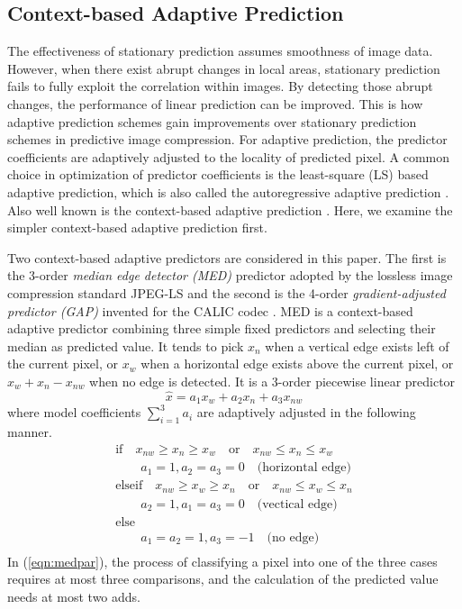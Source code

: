 \documentclass[journal]{IEEEtran}
\begin{document}
\subsection{Context-based Adaptive Prediction}\label{sub:cap}

The effectiveness of stationary prediction assumes smoothness of image data. However, when there
exist abrupt changes in local areas, stationary prediction fails to fully exploit the correlation
within images. By detecting those abrupt changes, the performance of linear prediction can be
improved. This is how adaptive prediction schemes gain improvements over stationary prediction
schemes in predictive image compression. For adaptive prediction, the predictor coefficients are
adaptively adjusted to the locality of predicted pixel. A common choice in optimization of predictor
coefficients is the least-square (LS) based adaptive prediction, which is also called the
autoregressive adaptive prediction \cite{Wu98icip,Li01edp,Kau05lsap}. Also well known is the
context-based adaptive prediction \cite{Memon97predictors}. Here, we examine the simpler
context-based adaptive prediction first.

Two context-based adaptive predictors are considered in this paper. The first is the 3-order
\emph{median edge detector (MED)} predictor adopted by the lossless image compression standard
JPEG-LS \cite{Loco00ip} and the second is the 4-order \emph{gradient-adjusted predictor (GAP)}
invented for the CALIC codec \cite{Wu97calic2,Wu97calic}. MED is a context-based adaptive predictor
combining three simple fixed predictors and selecting their median as predicted value. It tends to
pick $x_n$ when a vertical edge exists left of the current pixel, or $x_w$ when a horizontal edge
exists above the current pixel, or $x_w + x_n - x_{nw}$ when no edge is detected. It is a 3-order
piecewise linear predictor 
\begin{equation}\label{eqn:edpo3}
    \hat{x} = a_1x_{w} + a_2x_{n} + a_3x_{nw}
\end{equation}
where model coefficients $\sum_{i=1}^3 a_i$ are adaptively adjusted in the following manner. 
\begin{equation}\label{eqn:medpar}
    \begin{array}{l}
	\mbox{if} \quad x_{nw} \ge x_n \ge x_w \quad \mbox{or} \quad x_{nw} \le x_n \le x_w \\
	\quad \quad a_1 = 1, a_2 = a_3 = 0 \quad\mbox{(horizontal edge)} \\
	\mbox{elseif} \quad x_{nw} \ge x_w \ge x_n \quad \mbox{or} \quad x_{nw} \le x_w \le x_n \\
	\quad \quad a_2 = 1, a_1 = a_3 = 0 \quad\mbox{(vectical edge)} \\
	\mbox{else} \\
	\quad \quad a_1 = a_2 = 1, a_3 = -1 \quad\mbox{(no edge)} \\
    \end{array}
\end{equation}
In (\ref{eqn:medpar}), the process of classifying a pixel into one of the three cases requires at
most three comparisons, and the calculation of the predicted value needs at most two adds.
\end{document}
